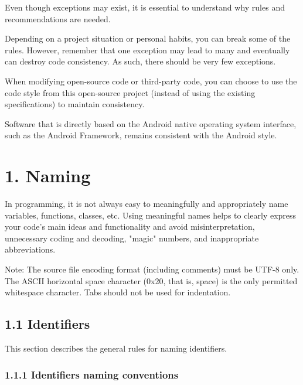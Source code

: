 {{{{{{{{{{{{{{{{\label{sec:}



Even though exceptions may exist, it is essential to understand why rules and recommendations are needed.

Depending on a project situation or personal habits, you can break some of the rules. However, remember that one exception may lead to many and eventually can destroy code consistency. As such, there should be very few exceptions.

When modifying open-source code or third-party code, you can choose to use the code style from this open-source project (instead of using the existing specifications) to maintain consistency.

Software that is directly based on the Android native operating system interface, such as the Android Framework, remains consistent with the Android style.

\section*{\textbf{1. Naming}}

\label{sec:1.}

In programming, it is not always easy to meaningfully and appropriately name variables, functions, classes, etc. Using meaningful names helps to clearly express your code's main ideas and functionality and avoid misinterpretation, unnecessary coding and decoding, "magic" numbers, and inappropriate abbreviations.



Note: The source file encoding format (including comments) must be UTF-8 only. The ASCII horizontal space character (0x20, that is, space) is the only permitted whitespace character. Tabs should not be used for indentation.



\subsection*{\textbf{1.1 Identifiers}}

\label{sec:1.1}

This section describes the general rules for naming identifiers.

\subsubsection*{\textbf{1.1.1 Identifiers naming conventions}}
\leavevmode\newline

}}}}}}}}}}}}}}}}
